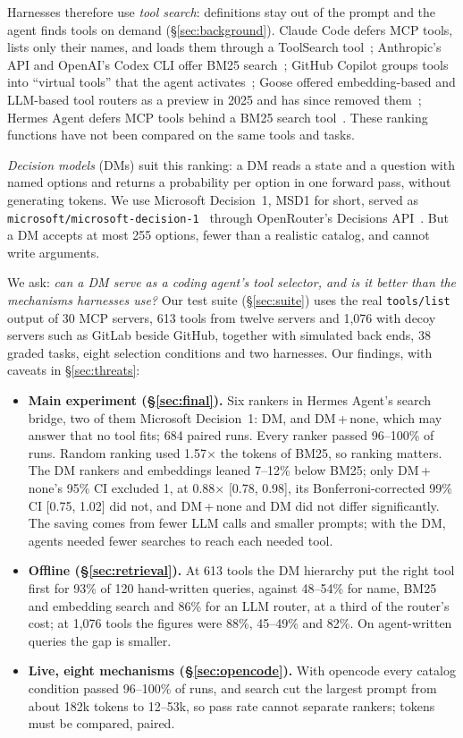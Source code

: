 \documentclass[11pt]{article}
\newcommand{\msd}{MSD1}
\newcommand{\dmn}{DM\,+\,none}
\begin{document}
Harnesses therefore use \emph{tool search}: definitions stay out of the prompt and the agent finds tools on demand
(\S\ref{sec:background}). Claude Code defers MCP tools, lists only their names, and loads them through a
ToolSearch tool~\citep{claudecode}; Anthropic's API and OpenAI's Codex CLI offer BM25
search~\citep{anthropic2025toolsearch,codexcli}; GitHub Copilot groups tools into ``virtual tools'' that the agent
activates~\citep{copilotvirtualtools}; Goose offered embedding-based and LLM-based tool routers as a preview in
2025 and has since removed them~\citep{goose}; Hermes Agent defers MCP tools behind a BM25 search
tool~\citep{hermesagent}. These ranking functions have not been compared on the same tools and tasks.

\emph{Decision models} (DMs) suit this ranking: a DM reads a state and a question with named options and returns
a probability per option in one forward pass, without generating tokens. We use Microsoft Decision~1, \msd{} for
short, served as \texttt{microsoft/microsoft-decision-1}~\citep{msd1} through OpenRouter's Decisions
API~\citep{openrouterdecisions}. But a DM accepts at most 255 options, fewer than a realistic catalog, and cannot
write arguments.

We ask: \emph{can a DM serve as a coding agent's tool selector, and is it better than the mechanisms harnesses
use?} Our test suite (\S\ref{sec:suite}) uses the real \texttt{tools/list} output of 30 MCP servers, 613 tools
from twelve servers and 1{,}076 with decoy servers such as GitLab beside GitHub, together with simulated back
ends, 38 graded tasks, eight selection conditions and two harnesses. Our findings, with caveats in
\S\ref{sec:threats}:
\begin{itemize}
\item \textbf{Main experiment (\S\ref{sec:final}).} Six rankers in Hermes Agent's search bridge, two of them
Microsoft Decision~1: DM, and \dmn{}, which may answer that no tool fits; 684 paired runs. Every ranker passed
96--100\% of runs. Random ranking used 1.57$\times$ the tokens of BM25, so ranking matters. The DM rankers and
embeddings leaned 7--12\% below BM25; only \dmn{}'s 95\% CI excluded 1, at 0.88$\times$ [0.78, 0.98], its
Bonferroni-corrected 99\% CI [0.75, 1.02] did not, and \dmn{} and DM did not differ significantly. The saving
comes from fewer LLM calls and smaller prompts; with the DM, agents needed fewer searches to reach each needed
tool.
\item \textbf{Offline (\S\ref{sec:retrieval}).} At 613 tools the DM hierarchy put the right tool first for 93\%
of 120 hand-written queries, against 48--54\% for name, BM25 and embedding search and 86\% for an LLM router, at a
third of the router's cost; at 1{,}076 tools the figures were 88\%, 45--49\% and 82\%. On agent-written queries
the gap is smaller.
\item \textbf{Live, eight mechanisms (\S\ref{sec:opencode}).} With opencode every catalog condition passed
96--100\% of runs, and search cut the largest prompt from about 182k tokens to 12--53k, so pass rate cannot
separate rankers; tokens must be compared, paired.
\end{itemize}
\end{document}
